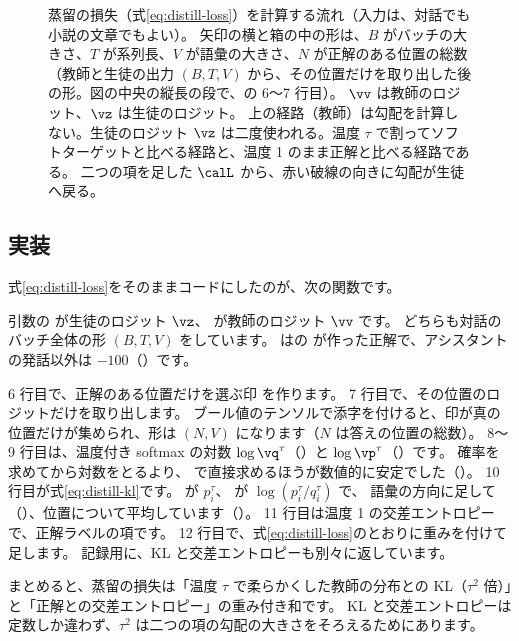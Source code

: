 \begin{figure}[tbp]
\begin{tikzpicture}[font=\footnotesize]
\end{tikzpicture}
\caption{蒸留の損失（式\eqref{eq:distill-loss}）を計算する流れ（入力は、対話でも小説の文章でもよい）。
矢印の横と箱の中の形は、$B$ がバッチの大きさ、$T$ が系列長、$V$ が語彙の大きさ、$N$ が正解のある位置の総数（教師と生徒の出力 $(B,T,V)$ から、その位置だけを取り出した後の形。図の中央の縦長の段で、の 6〜7 行目）。
$\vv$ は教師のロジット、$\vz$ は生徒のロジット。
上の経路（教師）は勾配を計算しない。生徒のロジット $\vz$ は二度使われる。温度 $\tau$ で割ってソフトターゲットと比べる経路と、温度 1 のまま正解と比べる経路である。
二つの項を足した $\calL$ から、赤い破線の向きに勾配が生徒へ戻る。}
\label{fig:distill-flow}
\end{figure}

\subsection{実装}\label{sec:distill-loss-impl}

式\eqref{eq:distill-loss}をそのままコードにしたのが、次の関数です。


引数の  が生徒のロジット $\vz$、 が教師のロジット $\vv$ です。
どちらも対話のバッチ全体の形 $(B, T, V)$ をしています。
 はの  が作った正解で、アシスタントの発話以外は $-100$（）です。

6 行目で、正解のある位置だけを選ぶ印  を作ります。
7 行目で、その位置のロジットだけを取り出します。
ブール値のテンソルで添字を付けると、印が真の位置だけが集められ、形は $(N, V)$ になります（$N$ は答えの位置の総数）。
8〜9 行目は、温度付き softmax の対数 $\log\vq^\tau$（）と $\log\vp^\tau$（）です。
確率を求めてから対数をとるより、 で直接求めるほうが数値的に安定でした（）。
10 行目が式\eqref{eq:distill-kl}です。
 が $p^\tau_i$、 が $\log(p^\tau_i/q^\tau_i)$ で、
語彙の方向に足して（）、位置について平均しています（）。
11 行目は温度 1 の交差エントロピーで、正解ラベルの項です。
12 行目で、式\eqref{eq:distill-loss}のとおりに重みを付けて足します。
記録用に、KL と交差エントロピーも別々に返しています。

まとめると、蒸留の損失は「温度 $\tau$ で柔らかくした教師の分布との KL（$\tau^2$ 倍）」と「正解との交差エントロピー」の重み付き和です。
KL と交差エントロピーは定数しか違わず、$\tau^2$ は二つの項の勾配の大きさをそろえるためにあります。


